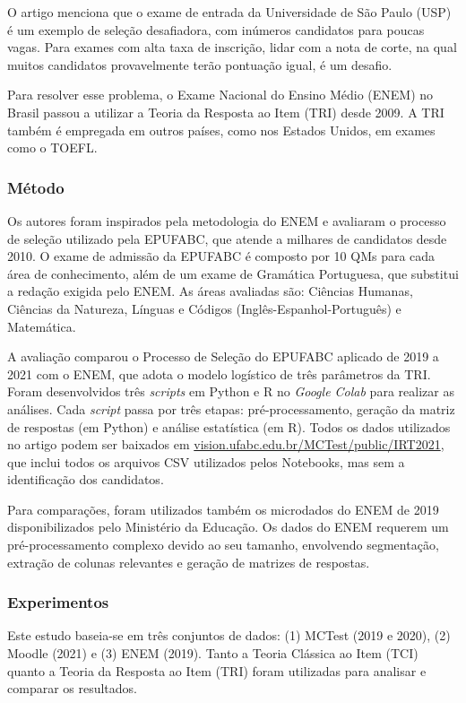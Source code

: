 O artigo menciona que o exame de entrada da Universidade de São Paulo (USP) é um exemplo de seleção desafiadora, com inúmeros candidatos para poucas vagas. Para exames com alta taxa de inscrição, lidar com a nota de corte, na qual muitos candidatos provavelmente terão pontuação igual, é um desafio.

Para resolver esse problema, o Exame Nacional do Ensino Médio (ENEM) no Brasil passou a utilizar a Teoria da Resposta ao Item (TRI) desde 2009. A TRI também é empregada em outros países, como nos Estados Unidos, em exames como o TOEFL.

\subsubsection*{Método}

Os autores foram inspirados pela metodologia do ENEM e avaliaram o processo de seleção utilizado pela EPUFABC, que atende a milhares de candidatos desde 2010. O exame de admissão da EPUFABC é composto por 10 QMs para cada área de conhecimento, além de um exame de Gramática Portuguesa, que substitui a redação exigida pelo ENEM. As áreas avaliadas são: Ciências Humanas, Ciências da Natureza, Línguas e Códigos (Inglês-Espanhol-Português) e Matemática.

A avaliação comparou o Processo de Seleção do EPUFABC aplicado de 2019 a 2021 com o ENEM, que adota o modelo logístico de três parâmetros da TRI. Foram desenvolvidos três \textit{scripts} em Python e R no \textit{Google Colab} para realizar as análises. Cada \textit{script} passa por três etapas: pré-processamento, geração da matriz de respostas (em Python) e análise estatística (em R). Todos os dados utilizados no artigo podem ser baixados em \href{http://vision.ufabc.edu.br/MCTest/public/IRT2021}{vision.ufabc.edu.br/MCTest/public/IRT2021}, que inclui todos os arquivos CSV utilizados pelos Notebooks, mas sem a identificação dos candidatos.

Para comparações, foram utilizados também os microdados do ENEM de 2019 disponibilizados pelo Ministério da Educação. Os dados do ENEM requerem um pré-processamento complexo devido ao seu tamanho, envolvendo segmentação, extração de colunas relevantes e geração de matrizes de respostas.

\subsubsection{Experimentos}

Este estudo baseia-se em três conjuntos de dados: (1) MCTest (2019 e 2020), (2) Moodle (2021) e (3) ENEM (2019). Tanto a Teoria Clássica ao Item (TCI) quanto a Teoria da Resposta ao Item (TRI) foram utilizadas para analisar e comparar os resultados.

